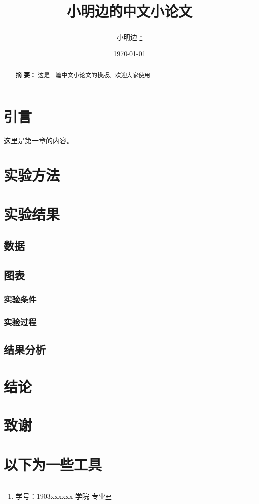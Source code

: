 \documentclass[UTF8,a4paper,12pt]{ctexart}
\title{\textbf{小明边的中文小论文}}
\author{ 小明边 \thanks{学号：1903xxxxxx 学院 专业} }
\date{\today}
\begin{document}
    \maketitle
     	\maketitle %
     	\renewcommand{\abstractname}{}%
     	\begin{abstract}
     		\noindent %
     		{\bf 摘{} 要：}
     		{\small 这是一篇中文小论文的模版。欢迎大家使用}
     	\end{abstract}

 \section{引言}
 这里是第一章的内容\cite{Liao2018A}。
 \section{实验方法}
 \section{实验结果}
 \subsection{数据}
 \subsection{图表}
 \subsubsection{实验条件}
 \subsubsection{实验过程}
 \subsection{结果分析}	
 \section{结论}
 \section{致谢}
 
 \section*{以下为一些工具}
 
\end{document}
